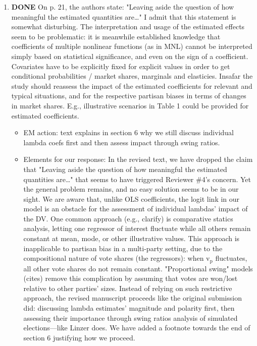 \documentclass{article}
\begin{document}
\begin{enumerate}
\begin{itemize}
\end{itemize}
\item {\bfseries\sffamily DONE} On p. 21, the authors state: "Leaving aside the question of how meaningful the estimated quantities are\ldots{}"  I admit that this statement is somewhat disturbing. The interpretation and usage of the estimated effects seem to be problematic: it is meanwhile established knowledge that coefficients of multiple nonlinear functions (as in MNL)  cannot be interpreted simply based on statistical significance, and even on the sign of a coefficient. Covariates have to be explicitly fixed for explicit values in order to get conditional probabilities / market shares, marginals and elasticies. Insafar the study should reassess the impact of the estimated coefficients for relevant and typical situations, and for the respective partisan biases in terms of  changes in market shares. E.g., illustrative scenarios in Table 1 could be provided for estimated coefficients.
\label{sec:orgheadline28}
\begin{itemize}
\item EM action: text explains in section 6 why we still discuss individual lambda coefs first and then assess impact through swing ratios.
\item Elements for our response: In the revised text, we have dropped the claim that "Leaving aside the question of how meaningful the estimated quantities are\ldots{}" that seems to have triggered Reviewer \#4's concern. Yet the general problem remains, and no easy solution seems to be in our sight. We are aware that, unlike OLS coefficients, the logit link in our model is an obstacle for the assessment of individual lambdas' impact of the DV. One common approach (e.g., clarify) is comparative statics analysis, letting one regressor of interest fluctuate while all others remain constant at mean, mode, or other illustrative values. This approach is inapplicable to partisan bias in a multi-party setting, due to the compositional nature of vote shares (the regressors): when v\(_{\text{p}}\) fluctuates, all other vote shares do not remain constant. "Proportional swing" models (cites) remove this complication by assuming that votes are won/lost relative to other parties' sizes. Instead of relying on such restrictive approach, the revised manuscript proceeds like the original submission did: discussing lambda estimates' magnitude and polarity first, then assessing their importance through swing ratios analysis of simulated elections---like Linzer does. We have added a footnote towards the end of section 6 justifying how we proceed.

\end{itemize}
\end{enumerate}
\end{document}
